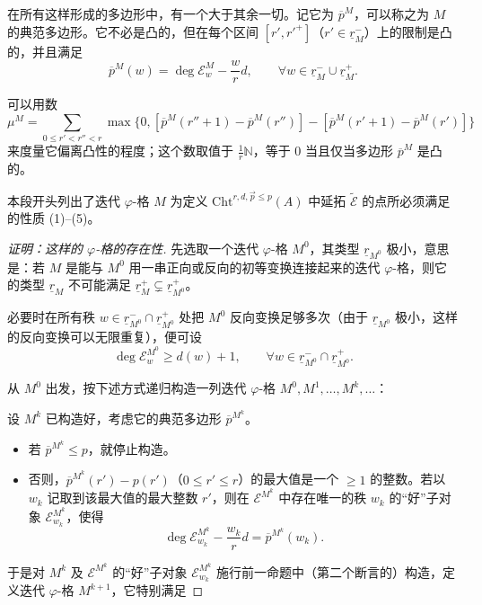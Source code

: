 在所有这样形成的多边形中，有一个大于其余一切。记它为 $\overline{p}^M$，可以称之为 $M$ 的典范多边形。它不必是凸的，但在每个区间 $[r', r'^+]$（$r' \in \underline{r}^-_M$）上的限制是凸的，并且满足
\[
\overline{p}^M(w) = \deg \mathcal{E}^M_w - \frac{w}{r}d, \qquad \forall w \in \underline{r}^-_M \cup \underline{r}^+_M.
\]

可以用数
\[
\mu^M = \sum_{0 \le r' < r'' < r} \max\{0, [\overline{p}^M(r''+1) - \overline{p}^M(r'')] - [\overline{p}^M(r'+1) - \overline{p}^M(r')]\}
\]
来度量它偏离凸性的程度；这个数取值于 $\frac{1}{r}\mathbb{N}$，等于 $0$ 当且仅当多边形 $\overline{p}^M$ 是凸的。

本段开头列出了迭代 $\varphi$-格 $M$ 为定义 $\mathrm{Cht}^{r,d,\vec{p}\le p}(A)$ 中延拓 $\tilde{\mathcal{E}}$ 的点所必须满足的性质 (1)–(5)。

\begin{proof}[证明：这样的 $\varphi$-格的存在性]
先选取一个迭代 $\varphi$-格 $M^0$，其类型 $\underline{r}_{M^0}$ 极小，意思是：若 $M$ 是能与 $M^0$ 用一串正向或反向的初等变换连接起来的迭代 $\varphi$-格，则它的类型 $\underline{r}_M$ 不可能满足 $\underline{r}^+_M \subsetneq \underline{r}^+_{M^0}$。

必要时在所有秩 $w \in \underline{r}^-_{M^0} \cap \underline{r}^+_{M^0}$ 处把 $M^0$ 反向变换足够多次（由于 $\underline{r}_{M^0}$ 极小，这样的反向变换可以无限重复），便可设
\[
\deg \mathcal{E}^{M^0}_w \geq d(w) + 1, \qquad \forall w \in \underline{r}^-_{M^0} \cap \underline{r}^+_{M^0}.
\]

从 $M^0$ 出发，按下述方式递归构造一列迭代 $\varphi$-格 $M^0, M^1, \dots, M^k, \dots$：

设 $M^k$ 已构造好，考虑它的典范多边形 $\overline{p}^{M^k}$。

\begin{itemize}
\item 若 $\overline{p}^{M^k} \leq p$，就停止构造。

\item 否则，$\overline{p}^{M^k}(r') - p(r')$（$0 \leq r' \leq r$）的最大值是一个 $\ge 1$ 的整数。若以 $w_k$ 记取到该最大值的最大整数 $r'$，则在 $\mathcal{E}^{M^k}$ 中存在唯一的秩 $w_k$ 的“好”子对象 $\mathcal{E}^{M^k}_{w_k}$，使得
\[
\deg \mathcal{E}^{M^k}_{w_k} - \frac{w_k}{r}d = \overline{p}^{M^k}(w_k).
\]
\end{itemize}

于是对 $M^k$ 及 $\mathcal{E}^{M^k}$ 的“好”子对象 $\mathcal{E}^{M^k}_{w_k}$ 施行前一命题中（第二个断言的）构造，定义迭代 $\varphi$-格 $M^{k+1}$，它特别满足


\end{proof}
